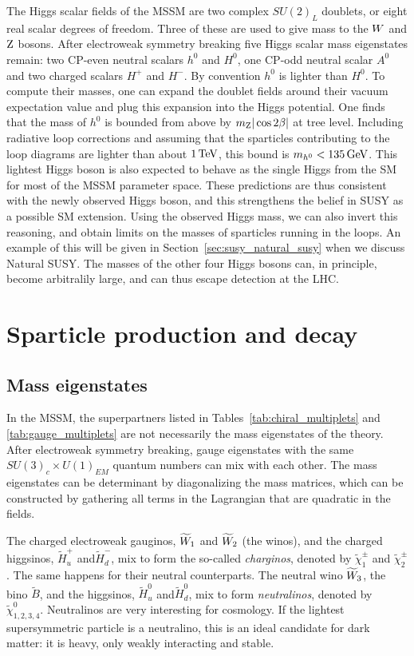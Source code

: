 The Higgs scalar fields of the MSSM are two complex $SU(2)_L$ doublets, or eight real scalar degrees
of freedom. 
Three of these are used to give mass to the $W$ and $\mathrm{Z}$ bosons. 
After electroweak symmetry breaking five Higgs scalar mass eigenstates remain: two CP-even neutral
scalars $h^0$ and $H^0$, one CP-odd neutral scalar $A^0$ and two charged scalars $H^+$ and $H^-$. By
convention $h^0$ is lighter than $H^0$. 
To compute their masses, one can expand the doublet fields around their vacuum expectation value and
plug this expansion into the Higgs potential. One finds that the mass of $h^0$ is bounded from
above by $m_{\mathrm{Z}} |\cos 2\beta|$ at tree level. Including radiative loop corrections and assuming
that the sparticles contributing to the loop diagrams are lighter than about $1\,\text{Te\hspace{-.08em}V}$, this bound is
$m_{h^0} < 135\,\text{Ge\hspace{-.08em}V}$. 
This lightest Higgs boson is also expected to behave as the single Higgs from the SM for most of
the MSSM parameter space. 
These predictions are thus consistent with the newly observed Higgs boson, and this strengthens the
belief in SUSY as a possible SM extension. Using the observed Higgs mass,
we can also invert this reasoning, and obtain limits on the masses of sparticles running in the
loops. An example of this will be given in Section~\ref{sec:susy_natural_susy} when we discuss
Natural SUSY. 
The masses of the other four Higgs bosons can, in principle, become arbitralily large, and can
thus escape detection at the LHC. 


\section{Sparticle production and decay \label{sec:susy_sparticles}}

\subsection{Mass eigenstates}

In the MSSM, the superpartners listed in Tables~\ref{tab:chiral_multiplets} and
\ref{tab:gauge_multiplets} are not necessarily the mass eigenstates of the theory. After
electroweak symmetry breaking, gauge eigenstates with the same $SU(3)_c \times U(1)_{EM}$ quantum
numbers can mix with each other. 
The mass eigenstates can be determinant by diagonalizing the mass matrices, which can be
constructed by gathering all terms in the Lagrangian that are quadratic in the fields. 

The charged electroweak gauginos, $\widetilde{W}_1$ and $\widetilde{W}_2$ (the winos), and the
charged higgsinos, $\widetilde{H}_u^+$ and$\widetilde{H}_d^-$, mix to form the so-called
\textit{charginos}, denoted by $\widetilde{\chi}_1^\pm$ and $\widetilde{\chi}_2^\pm$. 
The same happens for their neutral counterparts. The neutral wino $\widetilde{W}_3$, the bino
$\widetilde{B}$, and the higgsinos, $\widetilde{H}_u^0$ and$\widetilde{H}_d^0$,  mix to form
\textit{neutralinos}, denoted by $\widetilde{\chi}_{1,2,3,4}^0$. 
Neutralinos are very interesting for cosmology. If the lightest supersymmetric particle is a
neutralino, this is an ideal candidate for dark matter: it is heavy, only weakly interacting and
stable. 

